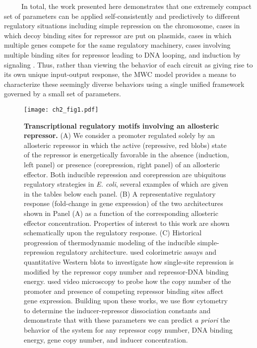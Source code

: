 \documentclass[12pt]{caltech_thesis}
\begin{document}
~~~~~In total, the work presented here demonstrates that one extremely
compact set of parameters can be applied self-consistently and
predictively to different regulatory situations including simple
repression on the chromosome, cases in which decoy binding sites for
repressor are put on plasmids, cases in which multiple genes compete for
the same regulatory machinery, cases involving multiple binding sites
for repressor leading to DNA looping, and induction by signaling
\autocite{garcia2011,garcia2011b,brewster2012,brewster2014,boedicker2013a,boedicker2013}.
Thus, rather than viewing the behavior of each circuit as giving rise to
its own unique input-output response, the MWC model provides a means to
characterize these seemingly diverse behaviors using a single unified
framework governed by a small set of parameters.

\hypertarget{fig:inducible_types}{%
\begin{figure}
\centering
\texttt{[image: ch2\_fig1.pdf]}
\caption[{Transcriptional regulatory architectures involving an
allosteric repressor.}]{\textbf{Transcriptional regulatory motifs
involving an allosteric repressor.} (A) We consider a promoter regulated
solely by an allosteric repressor in which the active (repressive, red
blobs) state of the repressor is energetically favorable in the absence
(induction, left panel) or presence (corepression, right panel) of an
allosteric effector. Both inducible repression and corepression are
ubiquitous regulatory strategies in \emph{E. coli}, several examples of
which are given in the tables below each panel. (B) A representative
regulatory response (fold-change in gene expression) of the two
architectures shown in Panel (A) as a function of the corresponding
allosteric effector concentration. Properties of interest to this work
are shown schematically upon the regulatory response. (C) Historical
progression of thermodynamic modeling of the inducible simple-repression
regulatory architecture. \textcite{garcia2011} used colorimetric assays
and quantitative Western blots to investigate how single-site repression
is modified by the repressor copy number and repressor-DNA binding
energy. \textcite{brewster2014} used video microscopy to probe how the
copy number of the promoter and presence of competing repressor binding
sites affect gene expression. Building upon these works, we use flow
cytometry to determine the inducer-repressor dissociation constants and
demonstrate that with these parameters we can predict \emph{a priori}
the behavior of the system for any repressor copy number, DNA binding
energy, gene copy number, and inducer concentration.}
\label{fig:inducible_types}
\end{figure}
}
\end{document}
